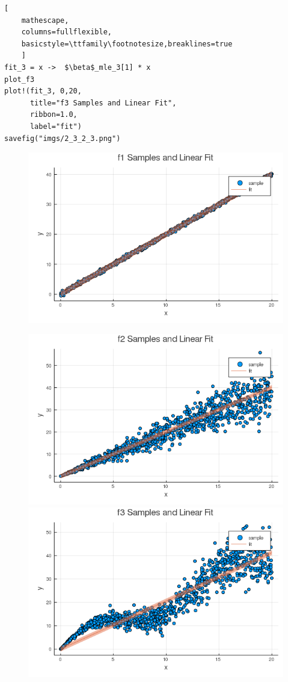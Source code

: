 \documentclass[12pt,letter]{article}
\begin{document}
\begin{enumerate}
\begin{lstlisting}[
    mathescape,
    columns=fullflexible,
    basicstyle=\ttfamily\footnotesize,breaklines=true
    ]
fit_3 = x ->  $\beta$_mle_3[1] * x
plot_f3
plot!(fit_3, 0,20,
      title="f3 Samples and Linear Fit",
      ribbon=1.0,
      label="fit")
savefig("imgs/2_3_2_3.png")
\end{lstlisting}
  
\begin{figure}[h]
  \centering
    \includegraphics[width=13cm,keepaspectratio]{imgs/2_3_2_1.png}
  \end{figure}
\pagebreak
\begin{figure}[h]
  \centering
  \includegraphics[width=13cm,keepaspectratio]{imgs/2_3_2_2.png}
  \includegraphics[width=13cm,keepaspectratio]{imgs/2_3_2_3.png}
\end{figure}


\end{enumerate}
\end{document}
